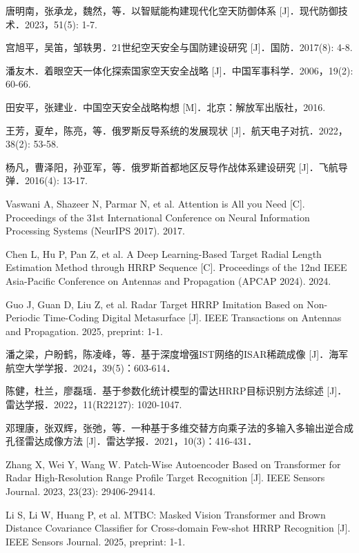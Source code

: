 \documentclass[doctor,twoside,ttf]{nudtpaper}
\begin{document}
\begin{thebibliography}{99}
 唐明南，张承龙，魏然，等．以智赋能构建现代化空天防御体系 [J]．现代防御技术．2023，51(5): 1-7.

 宫旭平，吴笛，邹轶男．21世纪空天安全与国防建设研究 [J]．国防．2017(8): 4-8.

 潘友木．着眼空天一体化探索国家空天安全战略 [J]．中国军事科学．2006，19(2): 60-66.

 田安平，张建业．中国空天安全战略构想 [M]．北京：解放军出版社，2016.

 王芳，夏牟，陈亮，等．俄罗斯反导系统的发展现状 [J]．航天电子对抗．2022，38(2): 53-58.

 杨凡，曹泽阳，孙亚军，等．俄罗斯首都地区反导作战体系建设研究 [J]．飞航导弹．2016(4): 13-17.

 Vaswani A, Shazeer N, Parmar N, et al. Attention is All you Need [C]. Proceedings of the 31st International Conference on Neural Information Processing Systems (NeurIPS 2017). 2017.

 Chen L, Hu P, Pan Z, et al. A Deep Learning-Based Target Radial Length Estimation Method through HRRP Sequence [C]. Proceedings of the 12nd IEEE Asia-Pacific Conference on Antennas and Propagation (APCAP 2024). 2024.

 Guo J, Guan D, Liu Z, et al. Radar Target HRRP Imitation Based on Non-Periodic Time-Coding Digital Metasurface [J]. IEEE Transactions on Antennas and Propagation. 2025, preprint: 1-1.

 潘之梁，户盼鹤，陈凌峰，等．基于深度增强IST网络的ISAR稀疏成像 [J]．海军航空大学学报．2024，39(5)：603-614．

 陈健，杜兰，廖磊瑶．基于参数化统计模型的雷达HRRP目标识别方法综述 [J]．雷达学报．2022，11(R22127): 1020-1047.

 邓理康，张双辉，张弛，等．一种基于多维交替方向乘子法的多输入多输出逆合成孔径雷达成像方法 [J]．雷达学报．2021，10(3)：416-431．

 Zhang X, Wei Y, Wang W. Patch-Wise Autoencoder Based on Transformer for Radar High-Resolution Range Profile Target Recognition [J]. IEEE Sensors Journal. 2023, 23(23): 29406-29414.

 Li S, Li W, Huang P, et al. MTBC: Masked Vision Transformer and Brown Distance Covariance Classifier for Cross-domain Few-shot HRRP Recognition [J]. IEEE Sensors Journal. 2025, preprint: 1-1.


\end{thebibliography}
\end{document}
